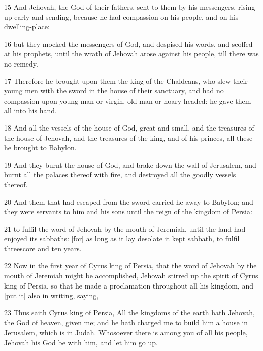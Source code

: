 \par 15 And Jehovah, the God of their fathers, sent to them by his messengers, rising up early and sending, because he had compassion on his people, and on his dwelling-place:
\par 16 but they mocked the messengers of God, and despised his words, and scoffed at his prophets, until the wrath of Jehovah arose against his people, till there was no remedy.
\par 17 Therefore he brought upon them the king of the Chaldeans, who slew their young men with the sword in the house of their sanctuary, and had no compassion upon young man or virgin, old man or hoary-headed: he gave them all into his hand.
\par 18 And all the vessels of the house of God, great and small, and the treasures of the house of Jehovah, and the treasures of the king, and of his princes, all these he brought to Babylon.
\par 19 And they burnt the house of God, and brake down the wall of Jerusalem, and burnt all the palaces thereof with fire, and destroyed all the goodly vessels thereof.
\par 20 And them that had escaped from the sword carried he away to Babylon; and they were servants to him and his sons until the reign of the kingdom of Persia:
\par 21 to fulfil the word of Jehovah by the mouth of Jeremiah, until the land had enjoyed its sabbaths: [for] as long as it lay desolate it kept sabbath, to fulfil threescore and ten years.
\par 22 Now in the first year of Cyrus king of Persia, that the word of Jehovah by the mouth of Jeremiah might be accomplished, Jehovah stirred up the spirit of Cyrus king of Persia, so that he made a proclamation throughout all his kingdom, and [put it] also in writing, saying,
\par 23 Thus saith Cyrus king of Persia, All the kingdoms of the earth hath Jehovah, the God of heaven, given me; and he hath charged me to build him a house in Jerusalem, which is in Judah. Whosoever there is among you of all his people, Jehovah his God be with him, and let him go up.

